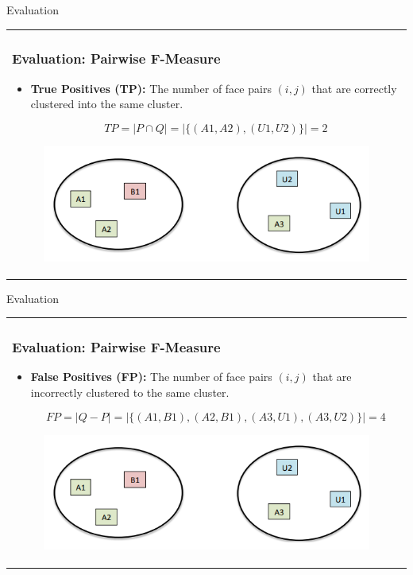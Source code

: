 \documentclass[11pt]{beamer}
\begin{document}
\begin{frame}{Evaluation}
\begin{tabular}{l}
\parbox{1\linewidth}{
\frametitle{Evaluation: Pairwise F-Measure}
\begin{itemize}
\item \textbf{True Positives (TP):} The number of face pairs $(i, j)$ that are correctly clustered into the same cluster.

$$TP = | P \cap Q | = |\{(A1, A2), (U1, U2)\}| = 2$$

\end{itemize}

\begin{figure}[!tbp]
 \centering
    \includegraphics[width=0.8\columnwidth]{figures/fmeasure.png}
    \label{fig:fmeasure}
\end{figure}
}
\end{tabular}  
\end{frame}

\begin{frame}{Evaluation}
\begin{tabular}{l}
\parbox{1\linewidth}{
\frametitle{Evaluation: Pairwise F-Measure}
\begin{itemize}
\item \textbf{False Positives (FP):} The number of face pairs $(i, j)$ that are incorrectly clustered to the same cluster.

$$FP = |Q - P| = |\{(A1, B1), (A2, B1), (A3, U1), (A3, U2)\}| = 4$$ 

\end{itemize}

\begin{figure}[!tbp]
 \centering
    \includegraphics[width=0.8\columnwidth]{figures/fmeasure.png}
    \label{fig:fmeasure}
\end{figure}
}
\end{tabular}  
\end{frame}
\end{document}

